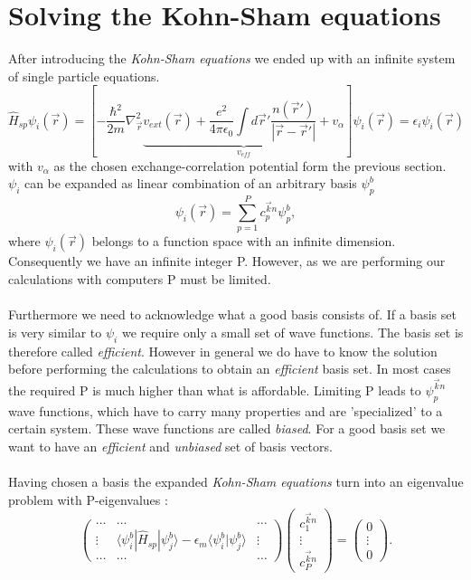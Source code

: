	\section{Solving the Kohn-Sham equations}
		After introducing the \textit{Kohn-Sham equations} we ended up with an infinite system of single particle equations.
		\begin{equation}
			\hat H_{sp} \psi_i (\vec r) = \left[ - \frac{\hbar^2}{2m} \nabla_\vec r^2 \underbrace{v_{ext}(\vec r) + \frac{e^2}{4 \pi \epsilon_0} \int d \vec r'\frac{n(\vec r')}{| \vec r - \vec r'|} + v_{\alpha}}_{v_{eff}} \right] \psi_i (\vec r) = \epsilon_i \psi_i (\vec r)
		\end{equation}
		with $v_\alpha$ as the chosen exchange-correlation potential form the previous section. \\
		$\psi_i$ can be expanded as linear combination of an arbitrary basis $\psi_p^b$
		\begin{equation}
			\psi_i(\vec r) = \sum_{p=1}^{P} c_p^{\vec k n} \psi_p^{b},
		\end{equation}
		where $\psi_i (\vec r)$ belongs to a function space with an infinite dimension. Consequently we have an infinite integer P. However, as we are performing our calculations with computers P must be limited. \\\\
		Furthermore we need to acknowledge what a good basis consists of. If a basis set is very similar to $\psi_i$ we require only a small set of wave functions. The basis set is therefore called \textit{efficient}. However in general we do have to know the solution before performing the calculations to obtain an \textit{efficient} basis set. In most cases the required P is much higher than what is affordable. Limiting P leads to $\psi_p^{\vec k n}$ wave functions, which have to carry many properties and are 'specialized' to a certain system. These wave functions are called \textit{biased}. For a good basis set we want to have an \textit{efficient} and \textit{unbiased} set of basis vectors. \\\\
		Having chosen a basis the expanded \textit{Kohn-Sham equations} turn into an eigenvalue problem with P-eigenvalues :
		\begin{equation}
			\label{eq:KohnSahmEigenvalueProblem}
			\begin{pmatrix}
				\dots & \dots & \dots \\
				\vdots & \langle \psi_i^b | \hat H_{sp} | \psi_j^b \rangle - \epsilon_m \langle \psi_i^b | \psi_j^b \rangle & \vdots \\
				\dots & \dots & \dots 
			\end{pmatrix}
			\begin{pmatrix}
				c_1^{\vec k n} \\
				\vdots \\
				c_P^{\vec k n}
			\end{pmatrix}
			= \begin{pmatrix}
				0 \\
				\vdots \\
				0
			\end{pmatrix}.
		\end{equation}
